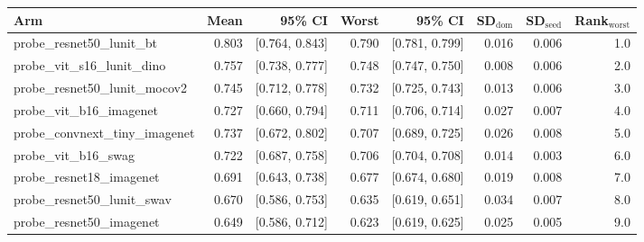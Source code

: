 \begin{tabular}{lrrrrrrr}
\toprule
Arm & Mean & 95\% CI & Worst & 95\% CI & SD$_\text{dom}$ & SD$_\text{seed}$ & Rank$_\text{worst}$ \\
\midrule
probe\_resnet50\_lunit\_bt & 0.803 & [0.764, 0.843] & 0.790 & [0.781, 0.799] & 0.016 & 0.006 & 1.0 \\
probe\_vit\_s16\_lunit\_dino & 0.757 & [0.738, 0.777] & 0.748 & [0.747, 0.750] & 0.008 & 0.006 & 2.0 \\
probe\_resnet50\_lunit\_mocov2 & 0.745 & [0.712, 0.778] & 0.732 & [0.725, 0.743] & 0.013 & 0.006 & 3.0 \\
probe\_vit\_b16\_imagenet & 0.727 & [0.660, 0.794] & 0.711 & [0.706, 0.714] & 0.027 & 0.007 & 4.0 \\
probe\_convnext\_tiny\_imagenet & 0.737 & [0.672, 0.802] & 0.707 & [0.689, 0.725] & 0.026 & 0.008 & 5.0 \\
probe\_vit\_b16\_swag & 0.722 & [0.687, 0.758] & 0.706 & [0.704, 0.708] & 0.014 & 0.003 & 6.0 \\
probe\_resnet18\_imagenet & 0.691 & [0.643, 0.738] & 0.677 & [0.674, 0.680] & 0.019 & 0.008 & 7.0 \\
probe\_resnet50\_lunit\_swav & 0.670 & [0.586, 0.753] & 0.635 & [0.619, 0.651] & 0.034 & 0.007 & 8.0 \\
probe\_resnet50\_imagenet & 0.649 & [0.586, 0.712] & 0.623 & [0.619, 0.625] & 0.025 & 0.005 & 9.0 \\
\bottomrule
\end{tabular}
